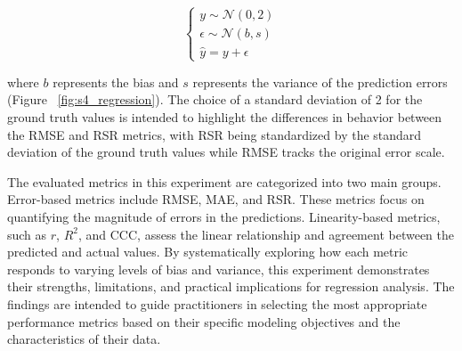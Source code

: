 \begin{equation}
\begin{cases}
y \sim \mathcal{N}(0, 2) \\
\epsilon \sim \mathcal{N}(b, s) \\
\hat{y} = y + \epsilon
\end{cases}
\end{equation}

where $b$ represents the bias and $s$ represents the variance of the prediction errors (Figure ~\ref{fig:s4_regression}). The choice of a standard deviation of 2 for the ground truth values is intended to highlight the differences in behavior between the RMSE and RSR metrics, with RSR being standardized by the standard deviation of the ground truth values while RMSE tracks the original error scale.


The evaluated metrics in this experiment are categorized into two main groups. Error-based metrics include RMSE, MAE, and RSR. These metrics focus on quantifying the magnitude of errors in the predictions. Linearity-based metrics, such as $r$, $R^2$, and CCC, assess the linear relationship and agreement between the predicted and actual values. By systematically exploring how each metric responds to varying levels of bias and variance, this experiment demonstrates their strengths, limitations, and practical implications for regression analysis. The findings are intended to guide practitioners in selecting the most appropriate performance metrics based on their specific modeling objectives and the characteristics of their data.

